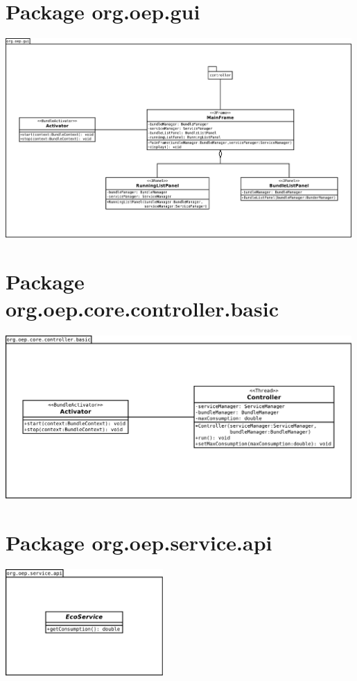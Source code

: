\documentclass[a4paper, 11pt]{report}
\begin{document}
\section{Package org.oep.gui}
	\begin{centering}
		\includegraphics[width=0.99\textwidth]{figures/EcoPattern_Gui_Classes}
	\end{centering}
\section{Package org.oep.core.controller.basic}
	\begin{centering}
		\includegraphics[width=0.99\textwidth]{figures/EcoPattern_Controller_Basic_Classes}
	\end{centering}
\section{Package org.oep.service.api}
	\begin{centering}
		\includegraphics[width=0.45\textwidth]{figures/EcoPattern_Service_Api_Classes}
	\end{centering}
\end{document}
